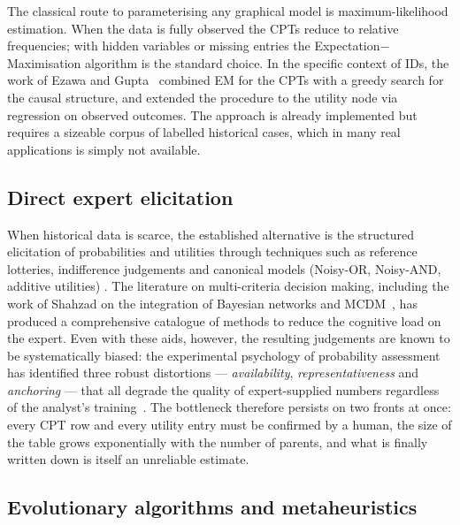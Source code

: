 The classical route to parameterising any graphical model is
maximum-likelihood estimation. When the data is fully observed the CPTs reduce to relative frequencies; with hidden variables or missing
entries the Expectation$-$Maximisation algorithm is the standard
choice. In the specific context of IDs, the work of Ezawa and Gupta~\cite{ezawa1997learning} combined EM for the CPTs with a
greedy search for the causal structure, and extended the procedure to
the utility node via regression on observed outcomes. The approach
is already implemented but requires a sizeable corpus of labelled historical cases, which in many real applications is simply not available.

\subsection{Direct expert elicitation}

When historical data is scarce, the established alternative is the
structured elicitation of probabilities and utilities through
techniques such as reference lotteries, indifference judgements and
canonical models (Noisy-OR, Noisy-AND, additive utilities)
\cite{bielza2010modeling}. The literature on multi-criteria decision
making, including the work of Shahzad on the integration of
Bayesian networks and MCDM~\cite{shahzad2022mcdm}, has produced a comprehensive catalogue of methods to reduce the cognitive load on the
expert. Even with these aids, however, the resulting judgements are known to be systematically biased: the experimental psychology of
probability assessment has identified three robust distortions —
\emph{availability}, \emph{representativeness} and
\emph{anchoring} — that all degrade the quality of expert-supplied
numbers regardless of the analyst's
training~\cite{bielza2010modeling}. The bottleneck therefore
persists on two fronts at once: every CPT row and every utility
entry must be confirmed by a human, the size of the table grows
exponentially with the number of parents, and what is finally
written down is itself an unreliable estimate.

\subsection{Evolutionary algorithms and metaheuristics}

